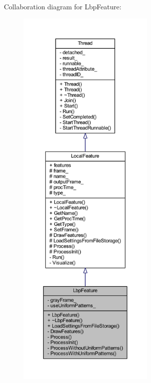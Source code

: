 Collaboration diagram for Lbp\-Feature\-:
\nopagebreak
\begin{figure}[H]
\begin{center}
\leavevmode
\includegraphics[height=550pt]{class_lbp_feature__coll__graph}
\end{center}
\end{figure}
